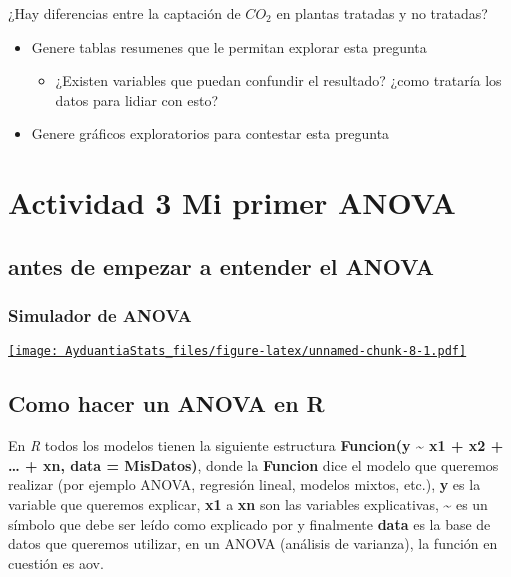 \documentclass[]{book}
\providecommand{\tightlist}{%
  \setlength{\itemsep}{0pt}\setlength{\parskip}{0pt}}
\begin{document}
¿Hay diferencias entre la captación de \(CO_2\) en plantas tratadas y no tratadas?

\begin{itemize}
\tightlist
\item
  Genere tablas resumenes que le permitan explorar esta pregunta

  \begin{itemize}
  \tightlist
  \item
    ¿Existen variables que puedan confundir el resultado? ¿como trataría los datos para lidiar con esto?
  \end{itemize}
\item
  Genere gráficos exploratorios para contestar esta pregunta
\end{itemize}

\hypertarget{actividad-3-mi-primer-anova}{%
\section{Actividad 3 Mi primer ANOVA}\label{actividad-3-mi-primer-anova}}

\hypertarget{antes-de-empezar-a-entender-el-anova}{%
\subsection{antes de empezar a entender el ANOVA}\label{antes-de-empezar-a-entender-el-anova}}

\hypertarget{simulador-de-anova}{%
\subsubsection{Simulador de ANOVA}\label{simulador-de-anova}}

\href{http://admin.derek-corcoran-barrios.com/shiny/rstudio/sample-apps/Shiny2/}{\texttt{[image: AyduantiaStats\_files/figure-latex/unnamed-chunk-8-1.pdf]}}

\hypertarget{como-hacer-un-anova-en-r}{%
\subsection{Como hacer un ANOVA en R}\label{como-hacer-un-anova-en-r}}

En \emph{R} todos los modelos tienen la siguiente estructura \textbf{Funcion(y \textasciitilde{} x1 + x2 + \ldots{} + xn, data = MisDatos)}, donde la \textbf{Funcion} dice el modelo que queremos realizar (por ejemplo ANOVA, regresión lineal, modelos mixtos, etc.), \textbf{y} es la variable que queremos explicar, \textbf{x1} a \textbf{xn} son las variables explicativas, \textbf{\textasciitilde{}} es un símbolo que debe ser leído como explicado por y finalmente \textbf{data} es la base de datos que queremos utilizar, en un ANOVA (análisis de varianza), la función en cuestión es aov.
\end{document}

